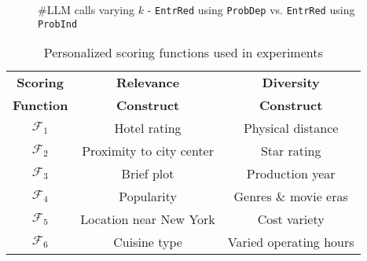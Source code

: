 \begin{comment}
    In a nutshell, Here is the order of time taken for each component of EntrRedInd and EntrRedDep:
\[
\text{Computing PDF} \gg \text{LLM Response} > \text{Determine next question}
\]
\[
> \text{Update bounds} > \text{Init candidates}.
\]
\end{comment}

\begin{figure*}[!htbp]
    \centering
    \hfill
    \hfill
    \caption{\small \#LLM calls varying \( k \) - {\tt EntrRed} using {\tt ProbDep} vs. {\tt EntrRed} using {\tt ProbInd}}
    \label{fig:quality_ind_dep}
     \vspace{-0.1in}
\end{figure*}

\begin{table}[!htbp]
\centering
\begin{tabular}{|c|c|c|}
\hline
\textbf{Scoring} & \textbf{Relevance} & \textbf{Diversity} \\ 
\textbf{Function} & \textbf{Construct} & \textbf{Construct} \\ \hline
\(\mathcal{F}_1\) & Hotel rating & Physical distance \\ \hline
\(\mathcal{F}_2\) & Proximity to city center & Star rating \\ \hline
\(\mathcal{F}_3\) & Brief plot & Production year \\ \hline
\(\mathcal{F}_4\) & Popularity & Genres \& movie eras \\ \hline
\(\mathcal{F}_5\) & Location near New York & Cost variety \\ \hline
\(\mathcal{F}_6\) & Cuisine type & Varied operating hours \\ \hline
\end{tabular}
\caption{\small Personalized scoring functions used in experiments}\label{tab:Scoring_functions}
\end{table}
\vspace{-0.3in}



